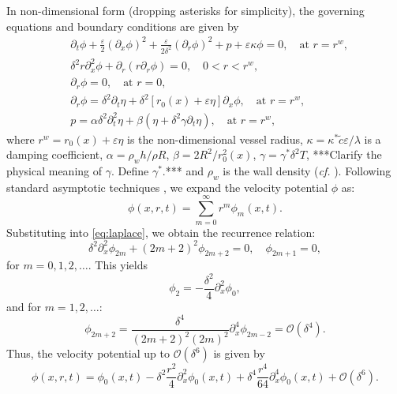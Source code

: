 \documentclass[alpha-refs, 12pt]{wiley-article}
\renewcommand{\O}{\mathcal{O}}
\newcommand{\eps}{\varepsilon}
\begin{document}
In non-dimensional form (dropping asterisks for simplicity), the governing equations and boundary conditions are given by
\begin{align}
& \partial_t \phi + \frac{\eps}{2} (\partial_x \phi)^2 + \frac{\eps}{2 \delta^2} (\partial_r \phi)^2 + p + \eps \kappa \phi = 0, \quad \text{at } r = r^w, \label{eq:bernoulli} \\
& \delta^2 r \partial_x^2 \phi + \partial_r (r \partial_r \phi) = 0, \quad 0 < r < r^w, \label{eq:laplace} \\
& \partial_r \phi = 0, \quad \text{at } r = 0, \label{eq:center_bc} \\
& \partial_r \phi = \delta^2 \partial_t \eta + \delta^2 [r_0(x) + \eps \eta] \partial_x \phi, \quad \text{at } r = r^w, \label{eq:wall_bc} \\
& p = \alpha \delta^2 \partial_t^2 \eta + \beta (\eta + \delta^2 \gamma \partial_t \eta), \quad \text{at } r = r^w, \label{eq:pressure}
\end{align}
where $r^w = r_0(x) + \eps \eta$ is the non-dimensional vessel radius, $\kappa = \kappa^* \tilde{c} \eps / \lambda$ is a damping coefficient, $\alpha = \rho_w h / \rho R$, $\beta = 2 R^2 / r_0^2(x)$, $\gamma = \gamma^* \delta^2 T$, {\color{red} ***Clarify the physical meaning of $\gamma$. Define $\gamma^*$.***}  and $\rho_w$ is the wall density (\emph{cf.} \citet{Mitsotakis2019}). Following standard asymptotic techniques \citep{BCS}, we expand the velocity potential $\phi$ as:
\begin{equation}\label{eq:potential}
  \phi(x, r, t) = \sum_{m=0}^\infty r^m \phi_m(x, t).
\end{equation}
Substituting into \eqref{eq:laplace}, we obtain the recurrence relation:
\begin{equation}\label{eq:recurr}
  \delta^2 \partial_x^2 \phi_{2m} + (2m + 2)^2 \phi_{2m+2} = 0, \quad \phi_{2m+1} = 0,
\end{equation}
for $m = 0, 1, 2, \dots$. This yields
\begin{equation}\label{eq:phi2}
  \phi_2 = -\frac{\delta^2}{4} \partial_x^2 \phi_0,
\end{equation}
and for $m = 1, 2, \dots$:
\begin{equation}\label{eq:phim}
  \phi_{2m+2} = \frac{\delta^4}{(2m + 2)^2 (2m)^2} \partial_x^4 \phi_{2m-2} = \O(\delta^4).
\end{equation}
  Thus, the velocity potential up to $\O(\delta^6)$ is given by
\begin{equation}\label{eq:potapr}
  \phi(x, r, t) = \phi_0(x, t) - \delta^2 \frac{r^2}{4} \partial_x^2 \phi_0(x, t) + \delta^4 \frac{r^4}{64} \partial_x^4 \phi_0(x, t) + \O(\delta^6).
\end{equation}
\end{document}
